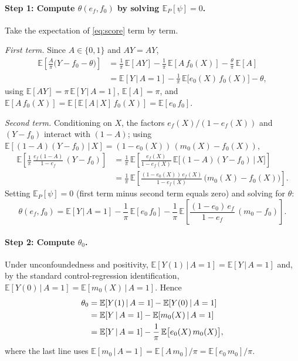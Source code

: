 \documentclass[11pt]{article}
\theoremstyle{plain}
\theoremstyle{remark}
\newcommand{\E}{\mathbb{E}}
\newcommand{\given}{\,\vert\,}
\newcommand{\ef}{e_f}
\newcommand{\ez}{e_0}
\newcommand{\mz}{m_0}
\newcommand{\fz}{f_0}
\begin{document}
\paragraph{Step 1: Compute $\theta(\ef, \fz)$ by solving $\E_P[\psi] = 0$.}
Take the expectation of \eqref{eq:score} term by term.

\emph{First term.} Since $A \in \{0,1\}$ and $A Y = A Y$,
\begin{align*}
  \E\!\left[\frac{A}{\pi}\bigl(Y - \fz - \theta\bigr)\right]
  &= \frac{1}{\pi}\,\E[A Y]
     - \frac{1}{\pi}\,\E[A\,\fz(X)]
     - \frac{\theta}{\pi}\,\E[A] \\
  &= \E[Y \given A = 1]
     - \frac{1}{\pi}\,\E\bigl[\ez(X)\,\fz(X)\bigr]
     - \theta,
\end{align*}
using $\E[AY] = \pi\,\E[Y \given A = 1]$, $\E[A] = \pi$, and
$\E[A\,\fz(X)] = \E[\E[A \given X]\,\fz(X)] = \E[\ez\,\fz]$.

\emph{Second term.} Conditioning on $X$, the factors $\ef(X)/(1-\ef(X))$ and
$(Y - \fz)$ interact with $(1 - A)$; using
$\E[(1-A)(Y-\fz) \given X] = (1 - \ez(X))\,(\mz(X) - \fz(X))$,
\begin{align*}
  \E\!\left[\frac{1}{\pi}\,\frac{\ef(1-A)}{1-\ef}\,(Y - \fz)\right]
  &= \frac{1}{\pi}\,
     \E\!\left[\frac{\ef(X)}{1 - \ef(X)}\,
       \E\bigl[(1-A)(Y - \fz) \given X\bigr]\right] \\
  &= \frac{1}{\pi}\,
     \E\!\left[\frac{(1 - \ez(X))\,\ef(X)}{1 - \ef(X)}\,
       \bigl(\mz(X) - \fz(X)\bigr)\right].
\end{align*}
Setting $\E_P[\psi] = 0$ (first term minus second term equals zero) and solving
for $\theta$:
\begin{equation}\label{eq:theta-working}
  \theta(\ef, \fz)
  = \E[Y \given A = 1]
    - \frac{1}{\pi}\,\E[\ez\,\fz]
    - \frac{1}{\pi}\,
      \E\!\left[\frac{(1 - \ez)\,\ef}{1 - \ef}\,(\mz - \fz)\right].
\end{equation}

\paragraph{Step 2: Compute $\theta_0$.}
Under unconfoundedness and positivity, $\E[Y(1) \given A = 1] = \E[Y \given A = 1]$
and, by the standard control-regression identification,
$\E[Y(0) \given A = 1] = \E[\mz(X) \given A = 1]$. Hence
\begin{align}
  \theta_0
  &= \E[Y(1) \given A = 1] - \E[Y(0) \given A = 1] \notag \\
  &= \E[Y \given A = 1] - \E[\mz(X) \given A = 1] \notag \\
  &= \E[Y \given A = 1] - \frac{1}{\pi}\,\E\bigl[\ez(X)\,\mz(X)\bigr],
    \label{eq:theta0}
\end{align}
where the last line uses
$\E[\mz \given A = 1] = \E[A\,\mz]/\pi = \E[\ez\,\mz]/\pi$.
\end{document}
